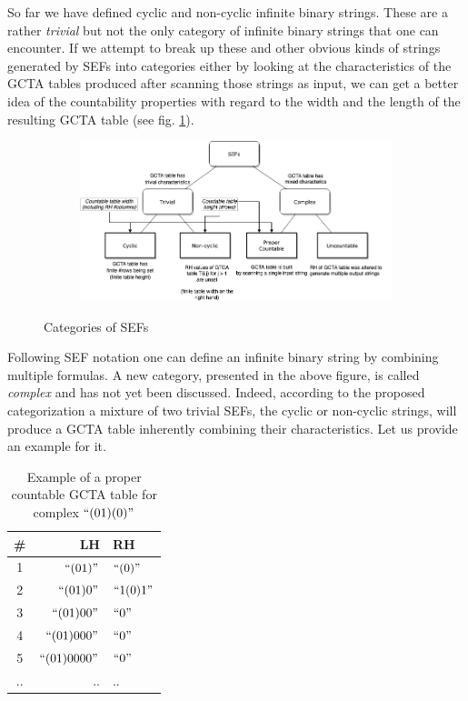 So far we have defined cyclic and non-cyclic infinite binary strings. These are a rather \textit{trivial} but not the only category of infinite binary strings that one can encounter. If we attempt to break up these and other obvious kinds of strings generated by SEFs into categories either by looking at the characteristics of the GCTA tables produced after scanning those strings as input, we can get a better idea of the countability properties with regard to the width and the length of the resulting GCTA table (see fig. \ref{fig:sefcat}).

\begin{figure}[h!]
  \centering
  \begin{subfigure}[b]{1.0\linewidth}
    \includegraphics[width=\linewidth]{appendix/CategoriesOfSEFs.png}
  \end{subfigure}
  \caption{Categories of SEFs}
  \label{fig:sefcat}
\end{figure}

Following SEF notation one can define an infinite binary string by combining multiple formulas. A new category, presented in the above figure, is called \textit{complex} and has not yet been discussed. Indeed, according to the proposed categorization a mixture of two trivial SEFs, the cyclic or non-cyclic strings, will produce a GCTA table inherently combining their characteristics. Let us provide an example for it.

\begin{table}[ht]
  \caption{Example of a proper countable GCTA table for complex $\text{``}(01)(0)\text{''}$}
  \centering
  \begin{tabular}{ |c|r|l| }
    \hline
    \# & LH                 & RH              \\
    \hline
    1  & $\text{``}(01)\text{''}$     & $\text{``}(0)\text{''}$   \\
    2  & $\text{``}(01)0\text{''}$    & $\text{``}1(0)1\text{''}$ \\
    3  & $\text{``}(01)00\text{''}$   & $\text{``}0\text{''}$     \\
    4  & $\text{``}(01)000\text{''}$  & $\text{``}0\text{''}$     \\
    5  & $\text{``}(01)0000\text{''}$ & $\text{``}0\text{''}$     \\
    .. & ..                 & ..              \\
    \hline
  \end{tabular}
  \label{Tab:ComplexGCTA}
\end{table}

